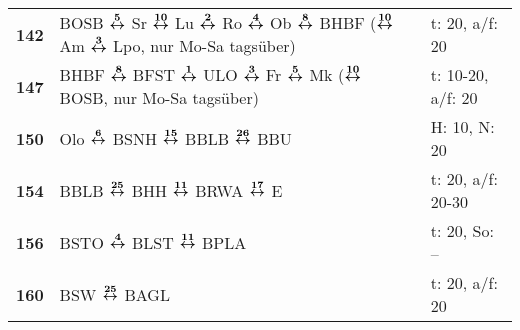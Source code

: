 \begin{minipage}[t]{0.45\textwidth}
\begin{tabular}{>{\bfseries}L{1.2cm}L{9.0cm}L{3.0cm}}
\bus{} 142    & BOSB $\xarwe{5}$ Sr $\xarwe{10}$ Lu $\xarwe{2}$ Ro $\xarwe{4}$ Ob $\xarwe{8}$ BHBF ($\xarwe{10}$ Am $\xarwe{3}$ Lpo, nur Mo-Sa tagsüber)                            & t: 20, a/f: 20             \\
\bus{} 147    & BHBF $\xarwe{8}$ BFST $\xarwe{1}$ ULO $\xarwe{3}$ Fr $\xarwe{5}$ Mk ($\xarwe{10}$ BOSB, nur Mo-Sa tagsüber)                                                         & t: 10-20, a/f: 20          \\
\bus{} 150    & Olo $\xarwe{6}$ BSNH $\xarwe{15}$ BBLB $\xarwe{26}$ BBU                                                                                                             & H: 10, N: 20               \\
\bus{} 154    & BBLB $\xarwe{25}$ BHH $\xarwe{11}$ BRWA $\xarwe{17}$ E
& t: 20, a/f: 20-30          \\
\bus{} 156    & BSTO $\xarwe{4}$ BLST $\xarwe{11}$ BPLA                                                                                                                             & t: 20, So: --              \\
\bus{} 160    & BSW $\xarwe{25}$ BAGL                                                                                                                                               & t: 20, a/f: 20             \\
\hline
\end{tabular}
\end{minipage}
